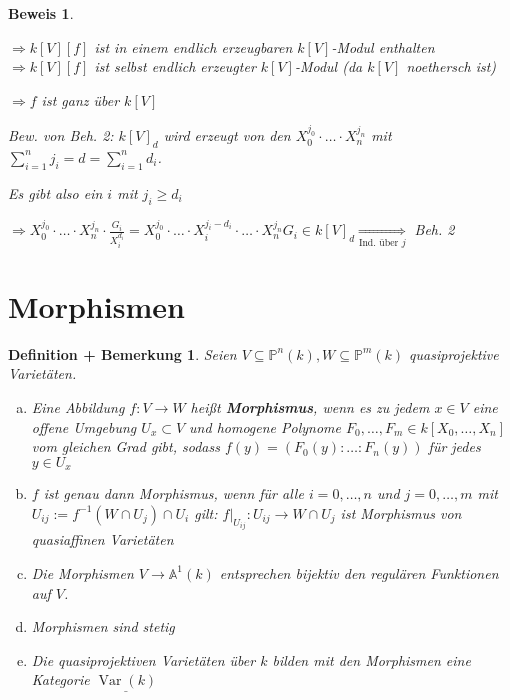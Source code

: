 \documentclass[a4paper, 12pt, numbers=noendperiod, chapterprefix=true, headsepline]{scrbook}
\theoremstyle{break}
\newtheorem{DefBem}[Def]{Definition + Bemerkung}
\theoremstyle{nonumberbreak}
\newtheorem{Bew}{Beweis}
\theoremstyle{nonumberplain}
\newcommand{\emp}[1]{\textbf{\emph{#1}}}
\newcommand{\defterm}[1]{{\index{#1}}\emp{#1}}
\newcommand{\Sum}{\sum\limits}
\DeclareMathOperator{\Var}{Var}
\newcommand{\A}{\mathbb{A}}
\newcommand{\IP}{\mathbb{P}}%
\begin{document}
\begin{Bew}
\begin{enumerate}[a)]
	$\Rightarrow k[V][f]$ ist in einem endlich erzeugbaren $k[V]$-Modul enthalten $\Rightarrow k[V][f]$ ist selbst endlich erzeugter $k[V]$-Modul (da $k[V]$ noethersch ist)
	
	$\Rightarrow f$ ist ganz \"uber $k[V]$
	
	\emph{Bew. von Beh. 2}: $k[V]_d$ wird erzeugt von den $X_0^{j_0}\cdot\ldots\cdot X_n^{j_n}$ mit $\Sum_{i=1}^nj_i=d=\Sum_{i=1}^nd_i$.
	
	Es gibt also ein $i$ mit $j_i\ge d_i$
	
	$\Rightarrow X_0^{j_0}\cdot\ldots \cdot X_n^{j_n} \cdot \frac{G_i}{X_i^{d_i}} = X_0^{j_0}\cdot \ldots \cdot X_i^{j_i-d_i} \cdot\ldots \cdot X_n^{j_n}G_i\in k[V]_d \underset{\text{Ind. \"uber }j}{\Longrightarrow}$ Beh. 2
\end{enumerate}\end{Bew}

\newpage


\section{Morphismen}

\begin{DefBem}\label{bem13.1}
Seien $V\subseteq\IP^n(k), W\subseteq\IP^m(k)$ quasiprojektive Variet\"aten.\begin{enumerate}[a)]
\item
	Eine Abbildung $f:V\to W$ hei\ss t \defterm{Morphismus}, wenn es zu jedem $x\in V$ eine offene Umgebung $U_x \subset V$ und homogene Polynome $F_0,\ldots ,F_m \in k[X_0,\ldots ,X_n]$ vom gleichen Grad gibt, sodass $f(y)=(F_0(y):\ldots :F_n(y))$ f\"ur jedes $y\in U_x$
\item\label{bem13.1b}
	$f$ ist genau dann Morphismus, wenn f\"ur alle $i=0,\ldots ,n$ und $j=0,\ldots ,m$ mit $U_{ij}:=f^{-1}(W\cap U_j)\cap U_i$ gilt: $f|_{U_{ij}}:U_{ij}\to W\cap U_j$ ist Morphismus von quasiaffinen Variet\"aten
\item\label{bem13.1c}
	Die Morphismen $V\to \A^1(k)$ entsprechen bijektiv den regul\"aren Funktionen auf $V$.
\item\label{bem13.1d}
	Morphismen sind stetig
\item
	Die quasiprojektiven Variet\"aten \"uber $k$ bilden mit den Morphismen eine Kategorie $\underline{\Var(k)}$
\end{enumerate}\end{DefBem}
\end{document}
